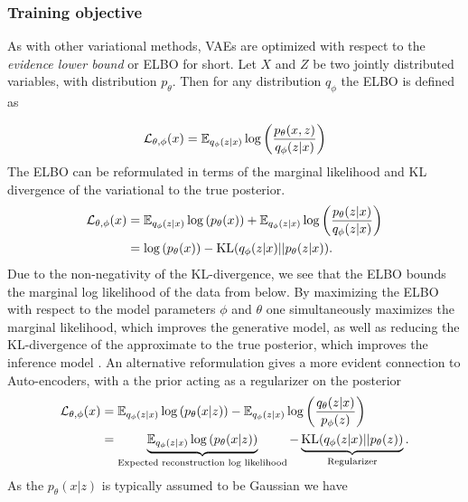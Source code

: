 \documentclass[../../thesis.tex]{subfiles}
\begin{document}
\subsubsection{Training objective}

As with other variational methods, VAEs are optimized with respect to the \textit{evidence lower bound} or ELBO for short. Let $X$ and $Z$ be two jointly distributed variables, with distribution $p_\theta$. Then for any distribution $q_\phi$ the ELBO is defined as

\begin{equation}
    \label{eq:ELBO}
    \mathcal{L}_{\theta,\phi}(x) 
    = \mathbb{E}_{q_\phi(z|x)} \log \left( \frac{p_\theta(x,z)}{q_\phi(z|x)}\right)
\end{equation}
The ELBO can be reformulated in terms of the marginal likelihood and KL divergence of the variational to the true posterior.
\begin{equation}
    \begin{aligned}
        \label{eq:ELBO_loglik}
        \mathcal{L}_{\theta,\phi}(x) 
        &=  \mathbb{E}_{q_\phi(z|x)} \log \left( p_\theta(x)\right) + \mathbb{E}_{q_\phi(z|x)} \log \left( \frac{p_\theta(z|x)}{q_\phi(z|x)}\right) \\
        &= \log \left( p_\theta(x)\right) - \textrm{KL}(q_\phi(z|x)|| p_\theta(z|x)).
    \end{aligned}
\end{equation}
Due to the non-negativity of the KL-divergence, we see that the ELBO bounds the marginal log likelihood of the data from below. By maximizing the ELBO with respect to the model parameters $\phi$ and $\theta$ one simultaneously maximizes the marginal likelihood, which improves the generative model, as well as reducing the KL-divergence of the approximate to the true posterior, which improves the inference model \cite{VAE}.\newline
An alternative reformulation gives a more evident connection to Auto-encoders, with a the prior acting as a regularizer on the posterior 
\begin{equation}
    \begin{aligned}
        \label{eq:ELBO_AE}
        \mathcal{L}_{\theta,\phi}(x) 
        &=  \mathbb{E}_{q_\phi(z|x)} \log \left( p_\theta(x|z)\right) - \mathbb{E}_{q_\phi(z|x)} \log \left( \frac{q_\theta(z|x)}{p_\phi(z)}\right) \\
        &= \underbrace{\mathbb{E}_{q_\phi(z|x)} \log \left( p_\theta(x|z)\right)}_{\text{Expected reconstruction log likelihood}} - \underbrace{\textrm{KL}(q_\phi(z|x)|| p_\theta(z))}_{\text{Regularizer}}.
    \end{aligned}
\end{equation}
As the $p_\theta(x|z)$ is typically assumed to be Gaussian we have
\end{document}
